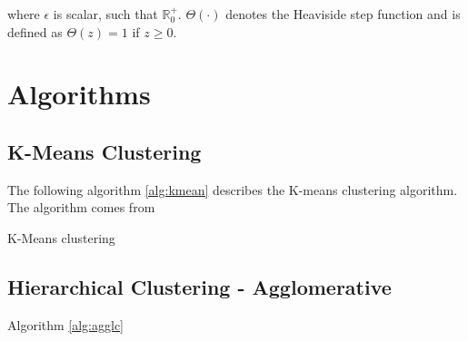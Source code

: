 \documentclass[12pt,a4paper,bibliography=totocnumbered,listof=totocnumbered]{scrartcl}
\begin{document}
{\begin{appendix}
where $\epsilon$ is scalar, such that $\mathbb{R}^+_0$. $\Theta(\cdot)$ denotes the Heaviside step function and is defined as $\Theta(z) = 1$ if $z\ge0$.
 
\pagebreak
\section{Algorithms}

\subsection{K-Means Clustering}

The following algorithm \ref{alg:kmean} describes the K-means clustering algorithm. The algorithm comes from \cite[page 354 et. seqq.]{Murphy2012}

\IncMargin{1em}
\begin{algorithm}
	\BlankLine
	\caption{K-Means clustering}\label{algo_disjdecomp}
	\label{alg:kmean}
\end{algorithm}\DecMargin{1em}
\pagebreak

\subsection{Hierarchical Clustering - Agglomerative}

Algorithm \ref{alg:agglc} \cite[page 895 et. seqq.]{Murphy2012}


\end{appendix}}
\end{document}
